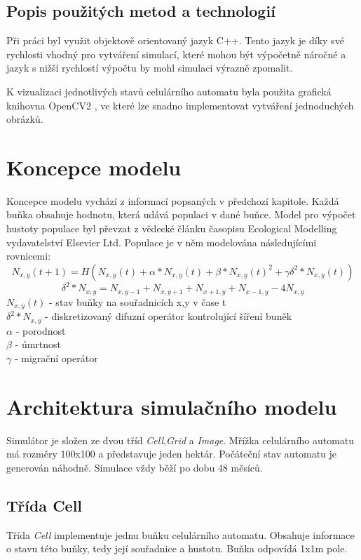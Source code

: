 \documentclass[a4paper,11pt]{article}
\begin{document}
\subsection{Popis použitých metod a technologií}
Při práci byl využit objektově orientovaný jazyk C++. Tento jazyk je díky své rychlosti vhodný pro vytváření simulací, které mohou být výpočetně náročné a jazyk s nižší rychlostí výpočtu by mohl simulaci výrazně zpomalit. 

K vizualizaci jednotlivých stavů celulárního automatu byla použita grafická knihovna OpenCV2 \cite{opencv2}, ve které lze snadno implementovat vytváření jednoduchých obrázků. 

\section{Koncepce modelu}
Koncepce modelu vychází z informací popsaných v předchozí kapitole. Každá buňka obsahuje hodnotu, která udává populaci v dané buňce. Model pro výpočet hustoty populace byl převzat z vědecké článku \cite{OurCA} časopisu Ecological Modelling vydavatelství Elsevier Ltd. Populace je v něm modelována následujícími rovnicemi:
\begin{equation}
N_{x,y}(t+1) = H(N_{x,y}(t) + \alpha*N_{x,y}(t) + \beta*N_{x,y}(t)^2 + \gamma\delta^2*N_{x,y}(t))
\end{equation}
\begin{equation}
\delta^2*N_{x,y} = N_{x,y-1} + N_{x,y+1} + N_{x+1,y} + N_{x-1,y} - 4N_{x,y}
\end{equation}
\( N_{x,y}(t) \) - stav buňky na souřadnicích x,y v čase t\ \\
\( \delta^2*N_{x,y} \) - diskretizovaný difuzní operátor kontrolující šíření buněk \\
\( \alpha \) - porodnost \\
\( \beta \) - úmrtnost \\
\( \gamma \) - migrační operátor\\


\section{Architektura simulačního modelu}
Simulátor je složen ze dvou tříd \emph{Cell},\emph{Grid} a \emph{Image}. Mřížka celulárního automatu má rozměry 100x100 a představuje jeden hektár. Počáteční stav automatu je generován náhodně. Simulace vždy běží po dobu 48 měsíců.

\subsection{Třída Cell}
Třída \emph{Cell} implementuje jednu buňku celulárního automatu. Obsahuje informace o stavu této buňky, tedy její souřadnice a hustotu. Buňka odpovídá 1x1m pole.
\end{document}
